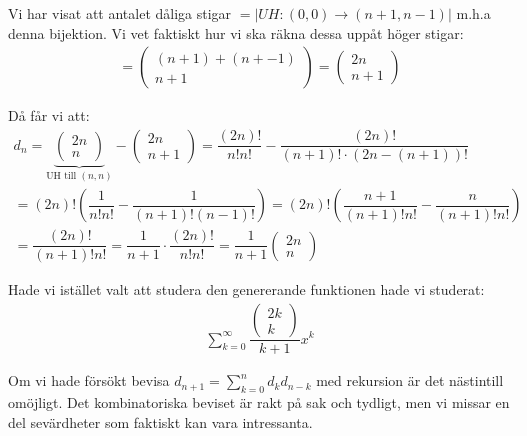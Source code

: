 \begin{prf}[]{}
  \par\bigskip
  \par\bigskip
  \noindent Vi har visat att antalet dåliga stigar $ = \left|UH:(0,0)\to(n+1,n-1)\right|$ m.h.a denna bijektion. Vi vet faktiskt hur vi ska räkna dessa uppåt höger stigar:
  \begin{equation*}
    \begin{gathered}
      = \begin{pmatrix}(n+1)+(n+-1)\\n+1\end{pmatrix} = \begin{pmatrix}2n\\n+1\end{pmatrix}
    \end{gathered}
  \end{equation*}
  \par\bigskip
  \noindent Då får vi att:
  \begin{equation*}
    \begin{gathered}
      d_n = \underbrace{\begin{pmatrix}2n\\n\end{pmatrix}}_{\text{UH till $(n,n)$}} - \begin{pmatrix}2n\\n+1\end{pmatrix} = \dfrac{(2n)!}{n!n!}-\dfrac{(2n)!}{(n+1)!\cdot(2n-(n+1))!}\\
      = (2n)!\left(\dfrac{1}{n!n!}-\dfrac{1}{(n+1)!(n-1)!}\right) = (2n)!\left(\dfrac{n+1}{(n+1)!n!}-\dfrac{n}{(n+1)!n!}\right)\\
      = \dfrac{(2n)!}{(n+1)!n!} = \dfrac{1}{n+1}\cdot\dfrac{(2n)!}{n!n!} = \dfrac{1}{n+1}\begin{pmatrix}2n\\n\end{pmatrix}
    \end{gathered}
  \end{equation*}
  \par\bigskip
  \noindent Hade vi istället valt att studera den genererande funktionen hade vi studerat:
  \begin{equation*}
    \begin{gathered}
      \sum_{k=0}^{\infty}\dfrac{\begin{pmatrix}2k\\k\end{pmatrix}}{k+1}x^k
    \end{gathered}
  \end{equation*}\par
  \noindent Om vi hade försökt bevisa $d_{n+1} = \sum_{k=0}^{n}d_kd_{n-k}$ med rekursion är det nästintill omöjligt. Det kombinatoriska beviset är rakt på sak och tydligt, men vi missar en del sevärdheter som faktiskt kan vara intressanta. 
\end{prf}
